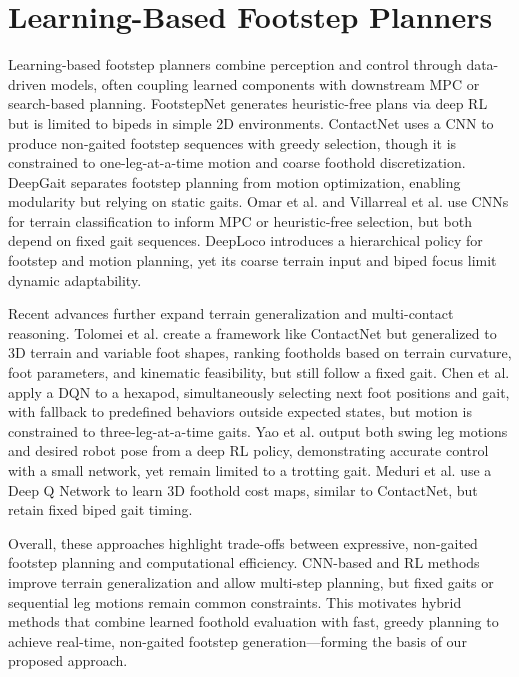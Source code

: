 \section{Learning-Based Footstep Planners}

Learning-based footstep planners combine perception and control
through data-driven models, often coupling learned components with
downstream MPC or search-based planning. FootstepNet
\cite{gaspard_footstepnet_2024} generates heuristic-free plans via
deep RL but is limited to bipeds in simple 2D environments.
ContactNet \cite{bratta_contactnet_2024} uses a CNN to produce
non-gaited footstep sequences with greedy selection, though it is
constrained to one-leg-at-a-time motion and coarse foothold
discretization. DeepGait \cite{tsounis_deepgait_2020} separates
footstep planning from motion optimization, enabling modularity but
relying on static gaits. Omar et al. \cite{omar_fast_2022} and
Villarreal et al. \cite{villarreal_fast_2019} use CNNs for terrain
classification to inform MPC or heuristic-free selection, but both
depend on fixed gait sequences. DeepLoco \cite{peng_deeploco_2017}
introduces a hierarchical policy for footstep and motion planning,
yet its coarse terrain input and biped focus limit dynamic adaptability.

Recent advances further expand terrain generalization and
multi-contact reasoning. Tolomei et al.
\cite{tolomei_learning-based_2025} create a framework like ContactNet
but generalized to 3D terrain and variable foot shapes, ranking
footholds based on terrain curvature, foot parameters, and kinematic
feasibility, but still follow a fixed gait. Chen et al.
\cite{chen_gait_2024} apply a DQN to a hexapod, simultaneously
selecting next foot positions and gait, with fallback to predefined
behaviors outside expected states, but motion is constrained to
three-leg-at-a-time gaits. Yao et al. \cite{yao_hierarchical_2021}
output both swing leg motions and desired robot pose from a deep RL
policy, demonstrating accurate control with a small network, yet
remain limited to a trotting gait. Meduri et al.
\cite{meduri_deepq_2021} use a Deep Q Network to learn 3D foothold
cost maps, similar to ContactNet, but retain fixed biped gait timing.

Overall, these approaches highlight trade-offs between expressive,
non-gaited footstep planning and computational efficiency. CNN-based
and RL methods improve terrain generalization and allow multi-step
planning, but fixed gaits or sequential leg motions remain common
constraints. This motivates hybrid methods that combine learned
foothold evaluation with fast, greedy planning to achieve real-time,
non-gaited footstep generation—forming the basis of our proposed approach.
